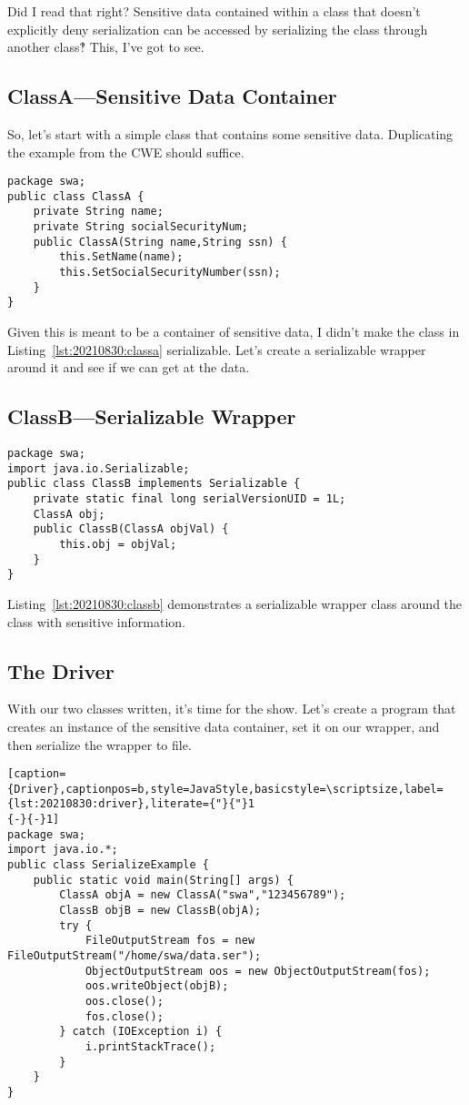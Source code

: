 Did I read that right? Sensitive data contained within a class that doesn't explicitly deny serialization can be accessed by serializing the class through another class‽ This, I've got to see.

\subsection{ClassA---Sensitive Data Container}
So, let's start with a simple class that contains some sensitive data. Duplicating the example from the CWE should suffice.
\begin{lstlisting}[caption={ClassA},captionpos=b,style=JavaStyle,label={lst:20210830:classa}]
package swa;
public class ClassA {
	private String name;
	private String socialSecurityNum;
	public ClassA(String name,String ssn) {
		this.SetName(name);
		this.SetSocialSecurityNumber(ssn);
	}
}
\end{lstlisting}

Given this is meant to be a container of sensitive data, I didn't make the class in Listing~\ref{lst:20210830:classa} serializable. Let's create a serializable wrapper around it and see if we can get at the data.

\subsection{ClassB---Serializable Wrapper}

\begin{lstlisting}[caption={ClassB},captionpos=b,style=JavaStyle,label={lst:20210830:classb}]
package swa;
import java.io.Serializable;
public class ClassB implements Serializable {
	private static final long serialVersionUID = 1L;
	ClassA obj;
	public ClassB(ClassA objVal) {
		this.obj = objVal;
	}
}
\end{lstlisting}

Listing~\ref{lst:20210830:classb} demonstrates a serializable wrapper class around the class with sensitive information.

\subsection{The Driver}
With our two classes written, it's time for the show. Let's create a program that creates an instance of the sensitive data container, set it on our wrapper, and then serialize the wrapper to file.

\begin{lstlisting}[caption={Driver},captionpos=b,style=JavaStyle,basicstyle=\scriptsize,label={lst:20210830:driver},literate={"}{"}1
{-}{-}1]
package swa;
import java.io.*;
public class SerializeExample {
	public static void main(String[] args) {
		ClassA objA = new ClassA("swa","123456789");
		ClassB objB = new ClassB(objA);
		try {
			FileOutputStream fos = new FileOutputStream("/home/swa/data.ser");
			ObjectOutputStream oos = new ObjectOutputStream(fos);
			oos.writeObject(objB);
			oos.close();
			fos.close();
		} catch (IOException i) {
			i.printStackTrace();
		}
	}
}
\end{lstlisting}


